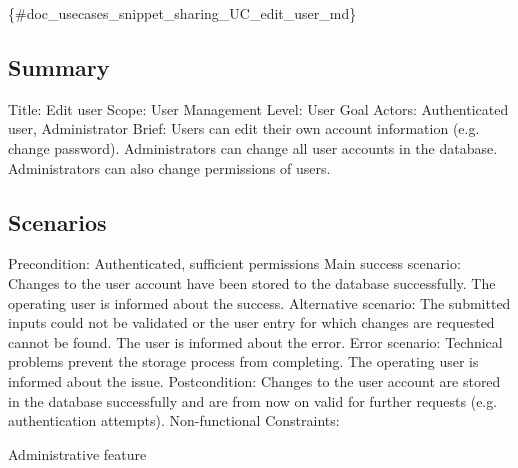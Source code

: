 \{\#doc\+\_\+usecases\+\_\+snippet\+\_\+sharing\+\_\+\+U\+C\+\_\+edit\+\_\+user\+\_\+md\}

\subsection*{Summary}

Title\+: Edit user Scope\+: User Management Level\+: User Goal Actors\+: Authenticated user, Administrator Brief\+: Users can edit their own account information (e.\+g. change password). Administrators can change all user accounts in the database. Administrators can also change permissions of users.

\subsection*{Scenarios}

Precondition\+: Authenticated, sufficient permissions Main success scenario\+: Changes to the user account have been stored to the database successfully. The operating user is informed about the success. Alternative scenario\+: The submitted inputs could not be validated or the user entry for which changes are requested cannot be found. The user is informed about the error. Error scenario\+: Technical problems prevent the storage process from completing. The operating user is informed about the issue. Postcondition\+: Changes to the user account are stored in the database successfully and are from now on valid for further requests (e.\+g. authentication attempts). Non-\/functional Constraints\+:
\begin{DoxyItemize}
\item Administrative feature 
\end{DoxyItemize}